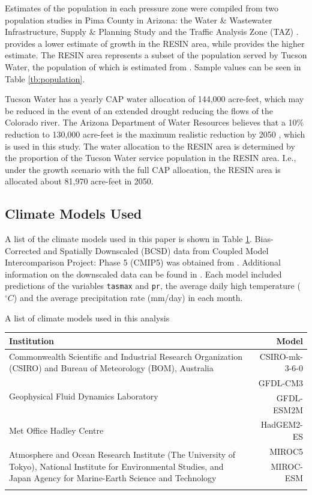 \documentclass[opre,nonblindrev]{informs3} %
\begin{document}
Estimates of the population in each pressure zone were compiled from two population studies in Pima County in Arizona: the Water \& Wastewater Infrastructure, Supply \& Planning Study \citep{wisp} and the Traffic Analysis Zone (TAZ) \citep{taz}.
\cite{taz} provides a lower estimate of growth in the RESIN area, while \cite{wisp} provides the higher estimate.
The RESIN area represents a subset of the population served by Tucson Water, the population of which is estimated from \cite{tucson}.
Sample values can be seen in Table \ref{tb:population}.

Tucson Water has a yearly CAP water allocation of 144,000 acre-feet, which may be reduced in the event of an extended drought reducing the flows of the Colorado river.
The Arizona Department of Water Resources believes that a 10\% reduction to 130,000 acre-feet is the maximum realistic reduction by 2050 \cite{scott2012scenario}, which is used in this study.
The water allocation to the RESIN area is determined by the proportion of the Tucson Water service population in the RESIN area.
I.e., under the \cite{wisp} growth scenario with the full CAP allocation, the RESIN area is allocated about 81,970 acre-feet in 2050.

\subsection{Climate Models Used}

A list of the climate models used in this paper is shown in Table \ref{tb:climate_models}.
Bias-Corrected and Spatially Downscaled (BCSD) data from Coupled Model Intercomparison Project: Phase 5 (CMIP5) was obtained from \cite{cmip5}.
Additional information on the downscaled data can be found in \cite{bcsdreclamation}.
Each model included predictions of the variables \texttt{tasmax} and \texttt{pr}, the average daily high temperature ($^\circ C$) and the average precipitation rate (mm/day) in each month.

\begin{table}
	\TABLE
	{
		A list of climate models used in this analysis
		\label{tb:climate_models}
	}
	{\begin{tabular}{p{}|r}
		\hline
		Institution & Model \\
		\hline
		\hline
		Commonwealth Scientific and Industrial Research Organization (CSIRO) and Bureau of Meteorology (BOM), Australia & CSIRO-mk-3-6-0 \\
		\hline
		\multirow{2}{*}{Geophysical Fluid Dynamics Laboratory} & GFDL-CM3 \\
		 & GFDL-ESM2M \\
		\hline
		Met Office Hadley Centre & HadGEM2-ES \\
		\hline
		\multirow{3}{*}{\vbox{Atmosphere and Ocean Research Institute (The University of Tokyo), National Institute for Environmental Studies, and Japan Agency for Marine-Earth Science and Technology}}  & MIROC5 \\
		 & MIROC-ESM \\
		 & \\
		\hline
	\end{tabular}}
	{}
\end{table}
\end{document}
